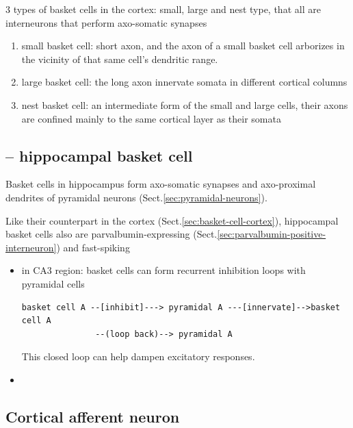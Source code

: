 3 types of basket cells in the cortex: small, large and nest type, that all are
interneurons that perform axo-somatic synapses
\begin{enumerate}
  
  \item small basket cell: short axon, and the axon of a small basket cell
  arborizes in the vicinity of that same cell's  dendritic range.
  
  \item large basket cell: the long axon innervate somata in different cortical
  columns
  
  \item nest basket cell: an intermediate form of the small and large cells,
  their axons are confined mainly to the same cortical layer as their somata
\end{enumerate}


\subsection{-- hippocampal basket cell}
\label{sec:basket-cell-hippocampus}

Basket cells in hippocampus form axo-somatic synapses and axo-proximal dendrites
of pyramidal neurons (Sect.\ref{sec:pyramidal-neurons}). 

Like their counterpart in the cortex (Sect.\ref{sec:basket-cell-cortex}),
hippocampal basket cells also are parvalbumin-expressing
(Sect.\ref{sec:parvalbumin-positive-interneuron}) and fast-spiking

\begin{itemize}

  \item in CA3 region: basket cells can form recurrent inhibition loops with
  pyramidal cells

\begin{verbatim}
basket cell A --[inhibit]---> pyramidal A ---[innervate]-->basket cell A
               --(loop back)--> pyramidal A
\end{verbatim}  
This closed loop can help dampen excitatory responses.

  \item 
\end{itemize}


\subsection{Cortical afferent neuron}
\label{sec:cortical-afferent-neuron}

